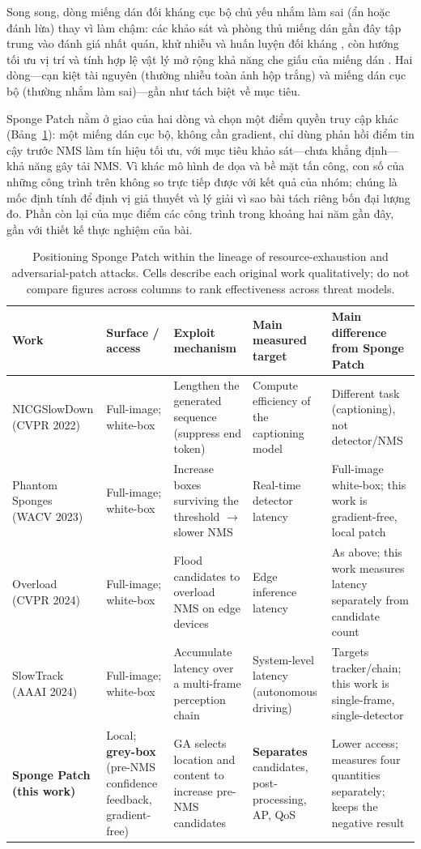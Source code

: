\documentclass[a4paper,fleqn]{cas-dc}
\begin{document}
Song song, dòng miếng dán đối kháng cục bộ chủ yếu nhắm làm sai (ẩn hoặc đánh lừa) thay vì làm chậm: các khảo sát và phòng thủ miếng dán gần đây tập trung vào đánh giá nhất quán, khử nhiễu và huấn luyện đối kháng \cite{apde2025,pbcat2025}, còn hướng tối ưu vị trí và tính hợp lệ vật lý mở rộng khả năng che giấu của miếng dán \cite{iap2025,badpatch2025}. Hai dòng---cạn kiệt tài nguyên (thường nhiễu toàn ảnh hộp trắng) và miếng dán cục bộ (thường nhắm làm sai)---gần như tách biệt về mục tiêu.

Sponge Patch nằm ở giao của hai dòng và chọn một điểm quyền truy cập khác (Bảng~\ref{tab:prior_attacks}): một miếng dán cục bộ, không cần gradient, chỉ dùng phản hồi điểm tin cậy trước NMS làm tín hiệu tối ưu, với mục tiêu khảo sát---chưa khẳng định---khả năng gây tải NMS. Vì khác mô hình đe dọa và bề mặt tấn công, con số của những công trình trên không so trực tiếp được với kết quả của nhóm; chúng là mốc định tính để định vị giả thuyết và lý giải vì sao bài tách riêng bốn đại lượng đo. Phần còn lại của mục điểm các công trình trong khoảng hai năm gần đây, gần với thiết kế thực nghiệm của bài.

\begin{table}[t]\centering\footnotesize
\setlength{\tabcolsep}{4pt}
\caption{Positioning Sponge Patch within the lineage of resource-exhaustion and adversarial-patch attacks. Cells describe each original work qualitatively; do not compare figures across columns to rank effectiveness across threat models.}
\label{tab:prior_attacks}
\begin{tabularx}{\textwidth}{@{}p{2.45cm}p{2.25cm}XXp{2.9cm}@{}}
\toprule
Work & Surface / access & Exploit mechanism & Main measured target & Main difference from Sponge Patch \\
\midrule
NICGSlowDown \cite{nicgslowdown2022} (CVPR 2022) & Full-image; white-box & Lengthen the generated sequence (suppress end token) & Compute efficiency of the captioning model & Different task (captioning), not detector/NMS \\
Phantom Sponges \cite{phantom2023} (WACV 2023) & Full-image; white-box & Increase boxes surviving the threshold $\to$ slower NMS & Real-time detector latency & Full-image white-box; this work is gradient-free, local patch \\
Overload \cite{overload2024} (CVPR 2024) & Full-image; white-box & Flood candidates to overload NMS on edge devices & Edge inference latency & As above; this work measures latency separately from candidate count \\
SlowTrack \cite{slowtrack2024} (AAAI 2024) & Full-image; white-box & Accumulate latency over a multi-frame perception chain & System-level latency (autonomous driving) & Targets tracker/chain; this work is single-frame, single-detector \\
\textbf{Sponge Patch (this work)} & Local; \textbf{grey-box} (pre-NMS confidence feedback, gradient-free) & GA selects location and content to increase pre-NMS candidates & \textbf{Separates} candidates, post-processing, AP, QoS & Lower access; measures four quantities separately; keeps the negative result \\
\bottomrule
\end{tabularx}
\end{table}
\end{document}
